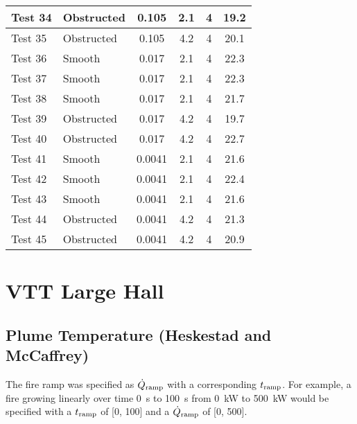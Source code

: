 \begin{table}[!ht]
\begin{center}
\begin {tabular}{|l|l|c|c|c|c|}
Test 34    &  Obstructed    &  0.105            &  2.1        &  4              &  19.2              \\ \hline
Test 35    &  Obstructed    &  0.105            &  4.2        &  4              &  20.1              \\ \hline
Test 36    &  Smooth        &  0.017            &  2.1        &  4              &  22.3              \\ \hline
Test 37    &  Smooth        &  0.017            &  2.1        &  4              &  22.3              \\ \hline
Test 38    &  Smooth        &  0.017            &  2.1        &  4              &  21.7              \\ \hline
Test 39    &  Obstructed    &  0.017            &  4.2        &  4              &  19.7              \\ \hline
Test 40    &  Obstructed    &  0.017            &  4.2        &  4              &  22.7              \\ \hline
Test 41    &  Smooth        &  0.0041           &  2.1        &  4              &  21.6              \\ \hline
Test 42    &  Smooth        &  0.0041           &  2.1        &  4              &  22.4              \\ \hline
Test 43    &  Smooth        &  0.0041           &  2.1        &  4              &  21.6              \\ \hline
Test 44    &  Obstructed    &  0.0041           &  4.2        &  4              &  21.3              \\ \hline
Test 45    &  Obstructed    &  0.0041           &  4.2        &  4              &  20.9              \\ \hline
\end{tabular}
\end{center}
\end{table}


\clearpage


\section{VTT Large Hall}

\subsection*{Plume Temperature (Heskestad and McCaffrey)}

The fire ramp was specified as $\dot Q\sb{ramp}$ with a corresponding $t\sb{ramp}$.
For example, a fire growing linearly over time 0~s to 100~s from 0~kW to 500~kW
would be specified with a $t\sb{ramp}$ of [0, 100] and a $\dot Q\sb{ramp}$ of [0, 500].

